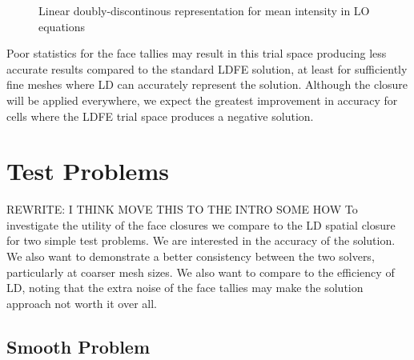 \begin{figure}[H]
    \centering
    {}
    \caption{Linear doubly-discontinous representation for mean intensity in LO equations}
    \label{fig:ldd_space}
\end{figure}

Poor statistics for the face tallies may result in this trial space producing less
accurate results compared to the standard LDFE solution, at least for sufficiently fine meshes where LD
can accurately represent the solution.  Although the closure will be applied everywhere,
we expect the greatest improvement in accuracy for cells where the LDFE trial space
produces a negative solution.

\section{Test Problems}

REWRITE: I THINK MOVE THIS TO THE INTRO SOME HOW
To investigate the utility of the face closures we compare to the LD spatial
closure for two simple test problems.  We are interested in the accuracy of the solution. 
We also want to demonstrate a better consistency between the two solvers, particularly at
coarser mesh sizes.  We also want to compare to the efficiency of LD, noting that the
extra noise of the face tallies may make the solution approach not worth it over all.

\subsection{Smooth Problem}

